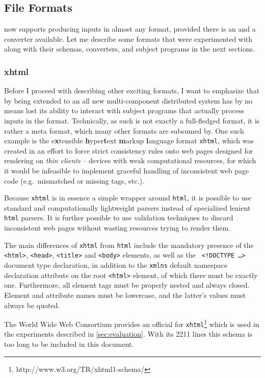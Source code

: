 \subsection{File Formats}
\label{sec:formats}
\xmlmate now supports producing inputs in almost any format, provided there is an \xsd and a converter
available. Let me describe some formats that were experimented with along with their schemas, converters, and
subject programs in the next sections.
\tocless\subsubsection{xhtml}
Before I proceed with describing other exciting formats, I want to emphasize that by being extended to an all
new multi-component distributed system \xmlmate has by no means lost its ability to interact with subject
programs that actually process inputs in the \xml format. Technically, \xml as such is not exactly a
full-fledged format, it is rather a meta format, which many other formats are subsumed by. One
such example is the e\textbf{x}tensible \textbf{h}yper\textbf{t}ext \textbf{m}arkup \textbf{l}anguage format
\texttt{xhtml}, which was created in an effort to force strict consistency rules onto web pages designed for
rendering on \emph{thin clients} -- devices with weak computational resources, for which it would be infeasible
to implement graceful handling of inconsistent web page code (e.g.\ mismatched or missing tags, etc.). 
 
Because \texttt{xhtml} is in essence a simple \xml wrapper around \texttt{html}, it is possible to use standard
and computationally lightweight \xml parsers instead of specialized lenient \texttt{html} parsers. It is
further possible to use \xml validation techniques to discard inconsistent web pages without wasting resources trying
to render them.

The main differences of \texttt{xhtml} from \texttt{html} include the mandatory presence of the
\texttt{<html>}, \texttt{<head>}, \texttt{<title>} and \texttt{<body>} elements, as well as the \texttt{\small
<!DOCTYPE \ldots> } document type declaration, in addition to the \texttt{xmlns} default namespace declaration
attribute on the root \texttt{<html>} element, of which there must be exactly one. Furthermore, all element
tags must be properly nested and always closed. Element and attribute names must be lowercase, and the
latter's values must always be quoted.

The World Wide Web Consortium provides an official \xsd for
\texttt{xhtml}\footnote{http://www.w3.org/TR/xhtml1-schema/} which is used in the \xmlmate experiments
described in \cref{sec:evaluation}. With its 2211 lines this schema is too long to be included
in this document.

